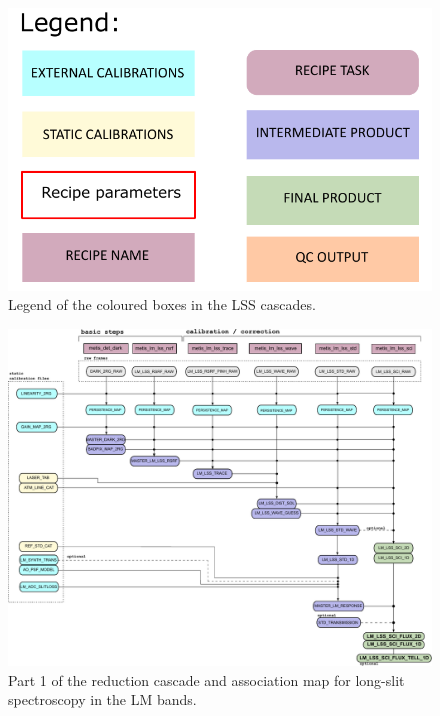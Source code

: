 \begin{figure}[ht]
  \centering
  \includegraphics[width=0.4\textheight]{figures/legend.pdf}
  \caption[Legend]{Legend of the coloured boxes in the \ac{LSS} cascades.}
  \label{Fig:LSScascadelegend}
\end{figure}
\clearpage


\begin{landscape}
\begin{figure}[ht]
  \centering
  \includegraphics{figures/LM_LSS_pipeline_wf_draft_latest_part_1_v0.84.pdf}
  \caption[Reduction cascade and association map for LM long-slit
  spectroscopy]{Part 1 of the reduction cascade and association map for long-slit
    spectroscopy in the LM bands.}
  \label{Fig:LMLssAssomap1}
\end{figure}
\end{landscape}

